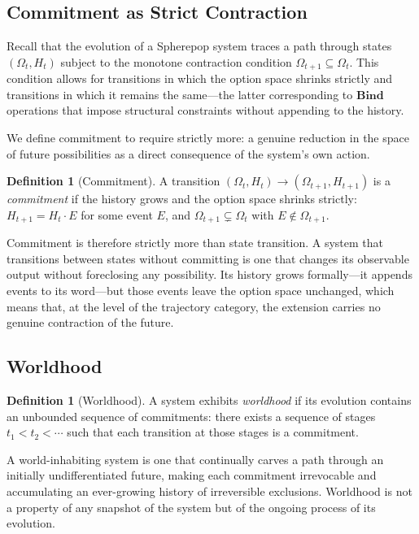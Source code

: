 \documentclass[12pt]{article}
\theoremstyle{plain}
\theoremstyle{definition}
\newtheorem{definition}[theorem]{Definition}
\theoremstyle{remark}
\newcommand{\Bind}{\mathbf{Bind}}
\begin{document}
\subsection{Commitment as Strict Contraction}

Recall that the evolution of a Spherepop system traces a path through states
$(\Omega_t, H_t)$ subject to the monotone contraction condition
$\Omega_{t+1} \subseteq \Omega_t$.  This condition allows for transitions in
which the option space shrinks strictly and transitions in which it remains the
same---the latter corresponding to $\Bind$ operations that impose structural
constraints without appending to the history.

We define commitment to require strictly more: a genuine reduction in the space
of future possibilities as a direct consequence of the system's own action.

\begin{definition}[Commitment]
A transition $(\Omega_t, H_t) \to (\Omega_{t+1}, H_{t+1})$ is a
\emph{commitment} if the history grows and the option space shrinks strictly:
$H_{t+1} = H_t \cdot E$ for some event $E$, and $\Omega_{t+1} \subsetneq
\Omega_t$ with $E \notin \Omega_{t+1}$.
\end{definition}

Commitment is therefore strictly more than state transition.  A system that
transitions between states without committing is one that changes its observable
output without foreclosing any possibility.  Its history grows formally---it
appends events to its word---but those events leave the option space unchanged,
which means that, at the level of the trajectory category, the extension carries
no genuine contraction of the future.

\subsection{Worldhood}

\begin{definition}[Worldhood]
A system exhibits \emph{worldhood} if its evolution contains an unbounded
sequence of commitments: there exists a sequence of stages
$t_1 < t_2 < \cdots$ such that each transition at those stages is a commitment.
\end{definition}

A world-inhabiting system is one that continually carves a path through an
initially undifferentiated future, making each commitment irrevocable and
accumulating an ever-growing history of irreversible exclusions.  Worldhood is
not a property of any snapshot of the system but of the ongoing process of its
evolution.
\end{document}
